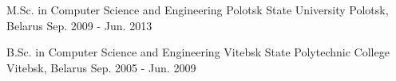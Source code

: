 

\begin{cventries}

  \cventry
    {M.Sc. in Computer Science and Engineering} %
    {Polotsk State University} %
    {Polotsk, Belarus} %
    {Sep. 2009 - Jun. 2013} %
    {}

  \cventry
    {B.Sc. in Computer Science and Engineering} %
    {Vitebsk State Polytechnic College} %
    {Vitebsk, Belarus} %
    {Sep. 2005 - Jun. 2009} %
    {}

\end{cventries}

